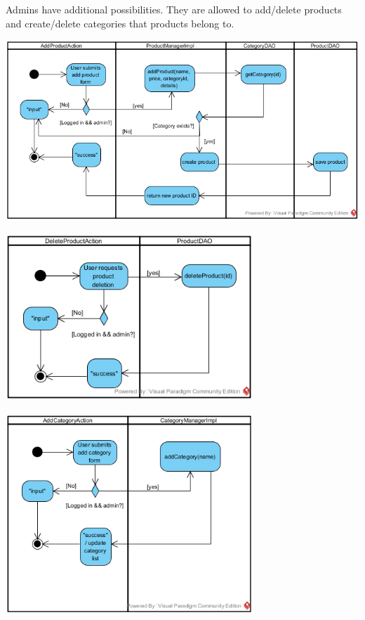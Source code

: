 \documentclass[11pt]{article}
\begin{document}
	Admins have additional possibilities. They are allowed to add/delete products and create/delete categories that products belong to.
	\begin{center}
	\includegraphics[width=\textwidth]{img/products/createproduct}
	\end{center}
	
	\begin{center}
	\includegraphics[width=0.7\textwidth]{img/products/deleteproduct}
	\end{center}
	
	\begin{center}
	\includegraphics[width=0.7\textwidth]{img/products/addcategory}
	\end{center}
	
\end{document}
